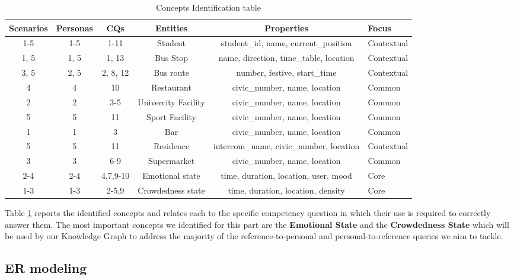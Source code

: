 \begin{table}[ht]
    \centering
    \begin{tabular}{|c|c|c|c|c|l|} \hline 
         Scenarios&  Personas&  CQs&  Entities& Properties &Focus\\ \hline 
         1-5&  1-5&  1-11&  Student&  student\_id, name, current\_position&Contextual\\ \hline 
1, 5&  1, 5&  1, 13&  Bus Stop&  name, direction, time\_table, location&Contextual\\ \hline 
         3, 5&  2, 5&  2, 8, 12&  Bus route&  number, festive, start\_time&Contextual\\ \hline
 4& 4& 10& Restaurant& civic\_number, name, location&Common\\\hline
 2& 2& 3-5& Univercity Facility& civic\_number, name, location&Common\\\hline
 5& 5& 11& Sport Facility& civic\_number, name, location&Common\\\hline
 1& 1& 3& Bar& civic\_number, name, location&Common\\\hline
 5& 5& 11& Residence& intercom\_name, civic\_number, location&Contextual\\ \hline 
 3& 3& 6-9& Supermarket& civic\_number, name, location&Common\\\hline
 2-4& 2-4& 4,7,9-10& Emotional state& time, duration, location, user, mood&Core\\\hline
 1-3& 1-3& 2-5,9& Crowdedness state& time, duration, location, density&Core\\\hline
    \end{tabular}
    \caption{Concepts Identification table}
    \label{tab:entity_table}
\end{table}

Table \ref{tab:entity_table} reports the identified concepts and relates each to the specific competency question in which their use is required to correctly answer them.
The most important concepts we identified for this part are the \textbf{Emotional State} and the \textbf{Crowdedness State} which will be used by our Knowledge Graph to address the majority of the reference-to-personal and personal-to-reference queries we aim to tackle.

\subsection{ER modeling}

